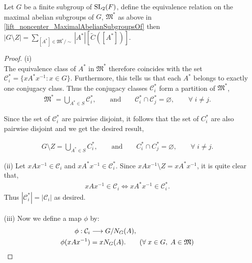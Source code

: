 \begin{theorem}
  \label{card_noncenter_fin_subgroup_eq_sum_card_noncenter_mul_index_normalizer}

Let $G$ be a finite subgroup of $\operatorname{SL}_2(F)$, define the equivalence relation on the maximal abelian subgroups of $G$, $\mathfrak{M}^*$ as above in \ref{lift_noncenter_MaximalAbelianSubgroupsOf}
then 
$|G \! \setminus  \! Z| = \sum_{[A^*] \in \mathfrak{M}^* / \sim} |A^*| [\tilde{C}([A^*])].$

\end{theorem}

\begin{proof}
(i)
\\
The equivalence class of $A^*$ in $\mathfrak{M}^*$ therefore coincides with the set $\mathcal{C}_i^* = \{ xA^*x^{-1} : x \in G \}$. Furthermore, this tells us that each $A^*$ belongs to exactly one conjugacy class. Thus the conjugacy classes $\mathcal{C}_i^*$ form a partition of $\mathfrak{M}^*$,
\begin{align*} \mathfrak{M}^* = \bigcup\limits_{A^* \in S} \mathcal{C}_i^*,  \qquad \text{and}  \qquad \mathcal{C}_i^* \cap \mathcal{C}_j^* = \varnothing, \qquad \forall \; i \neq j.
\end{align*}

Since the set of $\mathcal{C}_i^*$ are pairwise disjoint, it follows that the set of $C_i^*$ are also pairwise disjoint and we get the desired result,

\begin{align*} G \! \setminus \! Z = \bigcup\limits_{A^* \in S} C_i^*,  \qquad \text{and}  \qquad C_i^* \cap C_j^* = \varnothing, \qquad \forall \; i \neq j.
\end{align*}

(ii) Let $x A x^{-1} \in \mathcal{C}_i$ and $x A^* x^{-1} \in \mathcal{C}_i^*$. Since $x A x^{-1} \! \setminus \! Z = x A^* x^{-1}$, it is quite clear that,
\begin{align*} x A x^{-1} \in \mathcal{C}_i \iff x A^* x^{-1} \in \mathcal{C}_i^*.
\end{align*}
Thus $|\mathcal{C}_i^*| = |\mathcal{C}_i|$ as desired. \\
\\
(iii) Now we define a map $\phi$ by:
\begin{align*} \phi: \mathcal{C}_i &\longrightarrow G / N_G(A),
\\ \phi(xAx^{-1}) &= xN_G(A). \tag{$\forall \; x \in G, \; A \in \mathfrak{M}$}
\end{align*}


\end{proof}
